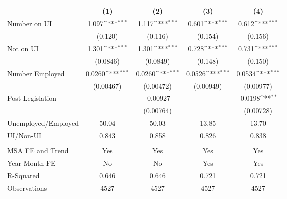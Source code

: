 {
\def\sym#1{\ifmmode^{#1}\else\(^{#1}\)\fi}
\begin{tabular}{l*{4}{c}}
\hline\hline
                    &\multicolumn{1}{c}{(1)}         &\multicolumn{1}{c}{(2)}         &\multicolumn{1}{c}{(3)}         &\multicolumn{1}{c}{(4)}         \\
\hline
Number on UI        &       1.097\sym{***}&       1.117\sym{***}&       0.601\sym{***}&       0.612\sym{***}\\
                    &     (0.120)         &     (0.116)         &     (0.154)         &     (0.156)         \\
\hline
Not on UI           &       1.301\sym{***}&       1.301\sym{***}&       0.728\sym{***}&       0.731\sym{***}\\
                    &    (0.0846)         &    (0.0849)         &     (0.148)         &     (0.150)         \\
\hline
Number Employed     &      0.0260\sym{***}&      0.0260\sym{***}&      0.0526\sym{***}&      0.0534\sym{***}\\
                    &   (0.00467)         &   (0.00472)         &   (0.00949)         &   (0.00977)         \\
\hline
Post Legislation    &                     &    -0.00927         &                     &     -0.0198\sym{**} \\
                    &                     &   (0.00764)         &                     &   (0.00728)         \\
\hline
Unemployed/Employed &       50.04         &       50.03         &       13.85         &       13.70         \\
UI/Non-UI           &       0.843         &       0.858         &       0.826         &       0.838         \\
\hline \vspace{-2mm}&                     &                     &                     &                     \\
MSA FE and Trend    &         Yes         &         Yes         &         Yes         &         Yes         \\
Year-Month FE       &          No         &          No         &         Yes         &         Yes         \\
R-Squared           &       0.646         &       0.646         &       0.721         &       0.721         \\
Observations        &        4527         &        4527         &        4527         &        4527         \\
\hline\hline
\end{tabular}
}
